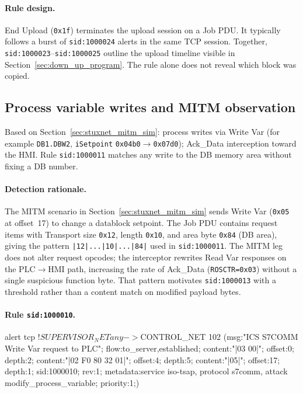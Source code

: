 \documentclass[../main.tex]{subfiles}
\begin{document}
\paragraph{Rule design.}
End Upload (\texttt{0x1f}) terminates the upload session on a Job PDU. It typically follows a burst of \texttt{sid:1000024} alerts in the same TCP session. Together, \texttt{sid:1000023}--\texttt{sid:1000025} outline the upload timeline visible in Section~\ref{sec:down_up_program}. The rule alone does not reveal which block was copied.

\subsection{Process variable writes and MITM observation}
\label{sec:rules-stuxnet}

Based on Section~\ref{sec:stuxnet_mitm_sim}: process writes via Write Var (for example \texttt{DB1.DBW2}, \texttt{iSetpoint} \texttt{0x04b0}$\rightarrow$\texttt{0x07d0}); Ack\_Data interception toward the HMI. Rule \texttt{sid:1000011} matches any write to the DB memory area without fixing a DB number.

\paragraph{Detection rationale.}
The MITM scenario in Section~\ref{sec:stuxnet_mitm_sim} sends Write Var (\texttt{0x05} at offset~17) to change a datablock setpoint. The Job PDU contains request items with Transport size \texttt{0x12}, length \texttt{0x10}, and area byte \texttt{0x84} (DB area), giving the pattern \texttt{|12|...|10|...|84|} used in \texttt{sid:1000011}. The MITM leg does not alter request opcodes; the interceptor rewrites Read Var responses on the PLC$\rightarrow$HMI path, increasing the rate of Ack\_Data (\texttt{ROSCTR=0x03}) without a single suspicious function byte. That pattern motivates \texttt{sid:1000013} with a threshold rather than a content match on modified payload bytes.

\paragraph{Rule \texttt{sid:1000010}.}
\begin{packetdump}
alert tcp !$SUPERVISOR_NET any -> $CONTROL_NET 102 (msg:"ICS S7COMM Write Var request to PLC";
  flow:to_server,established; content:"|03 00|"; offset:0; depth:2;
  content:"|02 F0 80 32 01|"; offset:4; depth:5; content:"|05|";
  offset:17; depth:1; sid:1000010; rev:1;
  metadata:service iso-tsap, protocol s7comm, attack modify_process_variable;
  priority:1;)
\end{packetdump}
\end{document}
